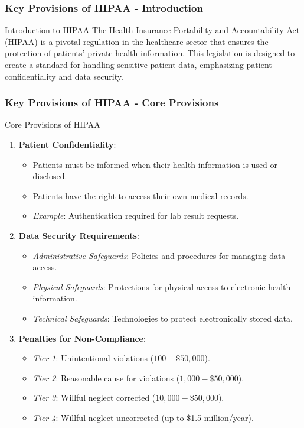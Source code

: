 \documentclass[aspectratio=169]{beamer}
\begin{document}
\begin{frame}[fragile]
    \frametitle{Key Provisions of HIPAA - Introduction}
    \begin{block}{Introduction to HIPAA}
        The Health Insurance Portability and Accountability Act (HIPAA) is a pivotal regulation in the healthcare sector that ensures the protection of patients' private health information. This legislation is designed to create a standard for handling sensitive patient data, emphasizing patient confidentiality and data security.
    \end{block}
\end{frame}

\begin{frame}[fragile]
    \frametitle{Key Provisions of HIPAA - Core Provisions}
    \begin{block}{Core Provisions of HIPAA}
        \begin{enumerate}
            \item \textbf{Patient Confidentiality}:
                \begin{itemize}
                    \item Patients must be informed when their health information is used or disclosed.
                    \item Patients have the right to access their own medical records.
                    \item \textit{Example}: Authentication required for lab result requests.
                \end{itemize}
            \item \textbf{Data Security Requirements}:
                \begin{itemize}
                    \item \textit{Administrative Safeguards}: Policies and procedures for managing data access.
                    \item \textit{Physical Safeguards}: Protections for physical access to electronic health information.
                    \item \textit{Technical Safeguards}: Technologies to protect electronically stored data.
                \end{itemize}
            \item \textbf{Penalties for Non-Compliance}:
                \begin{itemize}
                    \item \textit{Tier 1}: Unintentional violations ($100 - \$50,000$).
                    \item \textit{Tier 2}: Reasonable cause for violations ($1,000 - \$50,000$).
                    \item \textit{Tier 3}: Willful neglect corrected ($10,000 - \$50,000$).
                    \item \textit{Tier 4}: Willful neglect uncorrected (up to \$1.5 million/year).
                \end{itemize}
        \end{enumerate}
    \end{block}
\end{frame}
\end{document}
